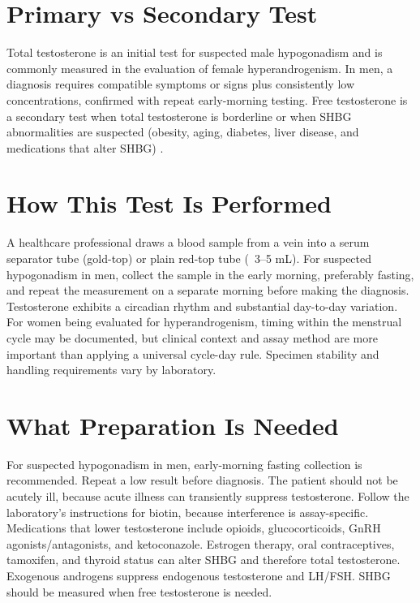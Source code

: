 \section*{Primary vs Secondary Test}
Total testosterone is an initial test for suspected male hypogonadism and is commonly measured in the evaluation of female hyperandrogenism. In men, a diagnosis requires compatible symptoms or signs plus consistently low concentrations, confirmed with repeat early-morning testing. Free testosterone is a secondary test when total testosterone is borderline or when SHBG abnormalities are suspected (obesity, aging, diabetes, liver disease, and medications that alter SHBG) \cite{bhasin2018testosterone,wierman2014androgen}.

\section*{How This Test Is Performed}
A healthcare professional draws a blood sample from a vein into a serum separator tube (gold-top) or plain red-top tube (~3--5 mL). For suspected hypogonadism in men, collect the sample in the early morning, preferably fasting, and repeat the measurement on a separate morning before making the diagnosis. Testosterone exhibits a circadian rhythm and substantial day-to-day variation. For women being evaluated for hyperandrogenism, timing within the menstrual cycle may be documented, but clinical context and assay method are more important than applying a universal cycle-day rule. Specimen stability and handling requirements vary by laboratory.

\section*{What Preparation Is Needed}
For suspected hypogonadism in men, early-morning fasting collection is recommended. Repeat a low result before diagnosis. The patient should not be acutely ill, because acute illness can transiently suppress testosterone. Follow the laboratory's instructions for biotin, because interference is assay-specific. Medications that lower testosterone include opioids, glucocorticoids, GnRH agonists/antagonists, and ketoconazole. Estrogen therapy, oral contraceptives, tamoxifen, and thyroid status can alter SHBG and therefore total testosterone. Exogenous androgens suppress endogenous testosterone and LH/FSH. SHBG should be measured when free testosterone is needed.

